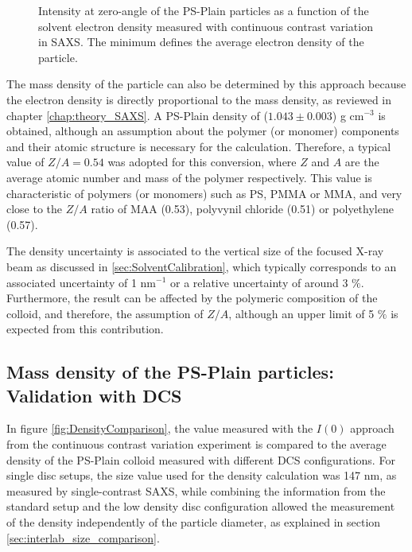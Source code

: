 \begin{figure}
	\begin{center}
		
	\end{center}
	\caption[Zero-angle intensity of the PS-Plain particles.]{Intensity at zero-angle of the PS-Plain particles as a function of the solvent electron density measured with continuous contrast variation in SAXS. The minimum defines the average electron density of the particle.}
	\label{fig:PSPlainAverageDensity}
\end{figure}

The mass density of the particle can also be determined by this approach because the electron density is directly proportional to the mass density, as reviewed in chapter \ref{chap:theory_SAXS}. A PS-Plain density of ($1.043\pm0.003$) g cm$^{-3}$ is obtained, although an assumption about the polymer (or monomer) components and their atomic structure is necessary for the calculation. Therefore, a typical value of $Z/A=0.54$ was adopted for this conversion, where $Z$ and $A$ are the average atomic number and mass of the polymer respectively. This value is characteristic of polymers (or monomers) such as PS, PMMA or MMA, and very close to the $Z/A$ ratio of MAA (0.53), polyvynil chloride (0.51) or polyethylene (0.57).

The density uncertainty is associated to the vertical size of the focused X-ray beam as discussed in \ref{sec:SolventCalibration}, which typically corresponds to an associated uncertainty of 1 nm$^{-1}$ or a relative uncertainty of around 3 $\%$. Furthermore, the result can be affected by the polymeric composition of the colloid, and therefore, the assumption of $Z/A$, although an upper limit of 5 $\%$ is expected from this contribution.

\subsection{Mass density of the PS-Plain particles: Validation with DCS}

In figure \ref{fig:DensityComparison}, the value measured with the $I(0)$ approach from the continuous contrast variation experiment is compared to the average density of the PS-Plain colloid measured with different DCS configurations. For single disc setups, the size value used for the density calculation was 147 nm, as measured by single-contrast SAXS, while combining the information from the standard setup and the low density disc configuration allowed the measurement of the density independently of the particle diameter, as explained in section \ref{sec:interlab_size_comparison}.

